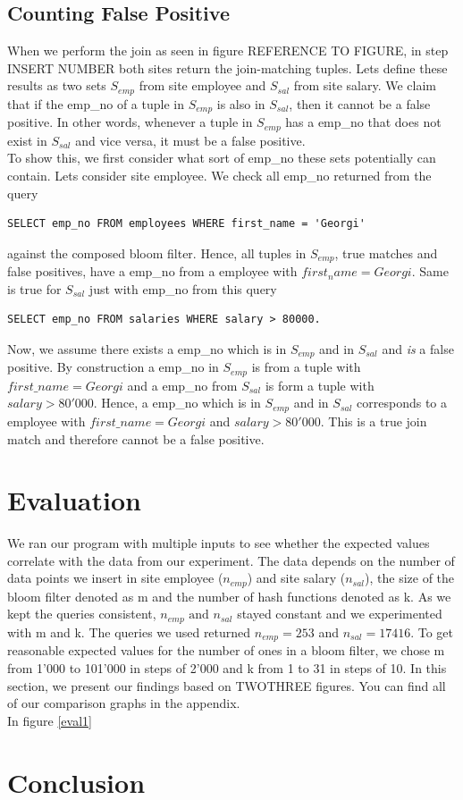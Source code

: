 \documentclass[12]{scrartcl}
\begin{document}
\subsection{Counting False Positive}
When we perform the join as seen in figure REFERENCE TO FIGURE, in step INSERT NUMBER both sites return the join-matching tuples. Lets define these results as two sets $S_{emp}$ from site employee and $S_{sal}$ from site salary. We claim that if the emp\_no of a tuple in $S_{emp}$ is also in $S_{sal}$, then it cannot be a false positive. In other words, whenever a tuple in $S_{emp}$ has a emp\_no that does not exist in $S_{sal}$ and vice versa, it must be a false positive. \\
To show this, we first consider what sort of emp\_no these sets potentially can contain. Lets consider site employee. We check all emp\_no returned from the query
\begin{verbatim}
SELECT emp_no FROM employees WHERE first_name = 'Georgi'
\end{verbatim}
against the composed bloom filter. Hence, all tuples in $S_{emp}$, true matches and false positives, have a emp\_no from a employee with $first_name = Georgi$. Same is true for $S_{sal}$ just with emp\_no from this query 
\begin{verbatim}
SELECT emp_no FROM salaries WHERE salary > 80000.
\end{verbatim}
Now, we assume there exists a emp\_no which is in $S_{emp}$ and in $S_{sal}$ and \emph{is} a false positive. By construction a emp\_no in $S_{emp}$ is from a tuple with $first\_name = Georgi$ and a emp\_no from $S_{sal}$ is form a tuple with $salary > 80'000$. Hence, a emp\_no which is in $S_{emp}$ and in $S_{sal}$ corresponds to a employee with $first\_name = Georgi$ and $salary > 80'000$. This is a true join match and therefore cannot be a false positive.


\section{Evaluation}
We ran our program with multiple inputs to see whether the expected values correlate with the data from our experiment. The data depends on the number of data points we insert in site employee ($n_{emp}$) and site salary ($n_{sal}$), the size of the bloom filter denoted as m and the number of hash functions denoted as k. As we kept the queries consistent, $n_{emp} \text{ and } n_{sal}$ stayed constant and we experimented with m and k. The queries we used returned $n_{emp} = 253$ and $n_{sal} = 17416$. To get reasonable expected values for the number of ones in a bloom filter, we chose m from 1'000 to 101'000 in steps of 2'000 and k from 1 to 31 in steps of 10.
In this section, we present our findings based on TWOTHREE figures. You can find all of our comparison graphs in the appendix.\\
In figure \ref{eval1}

\section{Conclusion}



\end{document}
